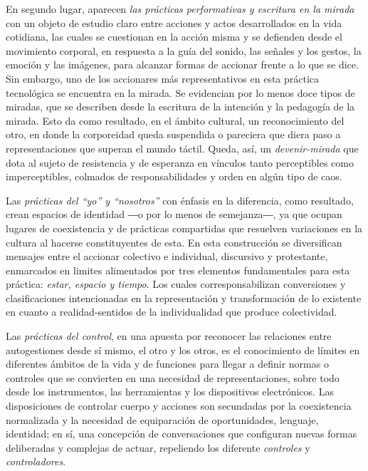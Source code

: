 \documentclass{textolivre}
\begin{document}
En segundo lugar, aparecen \textit{las prácticas performativas y escritura en la mirada} con un objeto de estudio claro entre acciones y actos desarrollados en la vida cotidiana, las cuales se cuestionan en la acción misma y se defienden desde el movimiento corporal, en respuesta a la guía del sonido, las señales y los gestos, la emoción y las imágenes, para alcanzar formas de accionar frente a lo que se dice. Sin embargo, uno de los accionares más representativos en esta práctica tecnológica se encuentra en la mirada. Se evidencian por lo menos doce tipos de miradas, que se describen desde la escritura de la intención y la pedagogía de la mirada. Esto da como resultado, en el ámbito cultural, un reconocimiento del otro, en donde la corporeidad queda suspendida o pareciera que diera paso a representaciones que superan el mundo táctil. Queda, así, un \textit{devenir-mirada} que dota al sujeto de resistencia y de esperanza en vínculos tanto perceptibles como imperceptibles, colmados de responsabilidades y orden en algún tipo de caos.

Las \textit{prácticas del “yo” y “nosotros”} con énfasis en la diferencia, como resultado, crean espacios de identidad ―o por lo menos de semejanza―, ya que ocupan lugares de coexistencia y de prácticas compartidas que resuelven variaciones en la cultura al hacerse constituyentes de esta. En esta construcción se diversifican mensajes entre el accionar colectivo e individual, discursivo y protestante, enmarcados en limites alimentados por tres elementos fundamentales para esta práctica: \textit{estar, espacio y tiempo}. Los cuales corresponsabilizan conversiones y clasificaciones intencionadas en la representación y transformación de lo existente en cuanto a realidad-sentidos de la individualidad que produce colectividad.

Las \textit{prácticas del control}, en una apuesta por reconocer las relaciones entre autogestiones desde sí mismo, el otro y los otros, es el conocimiento de límites en diferentes ámbitos de la vida y de funciones para llegar a definir normas o controles que se convierten en una necesidad de representaciones, sobre todo desde los instrumentos, las herramientas y los dispositivos electrónicos. Las disposiciones de controlar cuerpo y acciones son secundadas por la coexistencia normalizada y la necesidad de equiparación de oportunidades, lenguaje, identidad; en sí, una concepción de conversaciones que configuran nuevas formas deliberadas y complejas de actuar, repeliendo los diferente \textit{controles} y \textit{controladores}.
\end{document}
